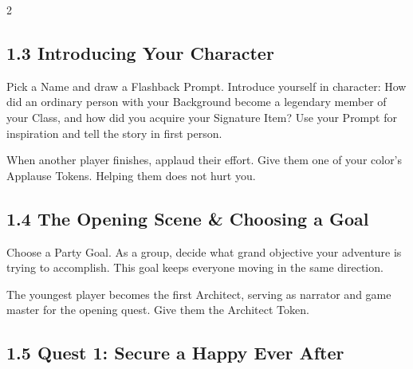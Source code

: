 \clearpage
\begin{multicols}{2}

\subsection*{1.3 Introducing Your Character}
Pick a Name and draw a Flashback Prompt. Introduce yourself in character: How did an ordinary person with your Background become a legendary member of your Class, and how did you acquire your Signature Item? Use your Prompt for inspiration and tell the story in first person.

When another player finishes, applaud their effort. Give them one of your color's Applause Tokens. Helping them does not hurt you.

\subsection*{1.4 The Opening Scene \& Choosing a Goal}
Choose a Party Goal. As a group, decide what grand objective your adventure is trying to accomplish. This goal keeps everyone moving in the same direction.

The youngest player becomes the first Architect, serving as narrator and game master for the opening quest. Give them the Architect Token.

\subsection*{1.5 Quest 1: Secure a Happy Ever After}
\begin{enumerate}
\end{enumerate}


\end{multicols}
